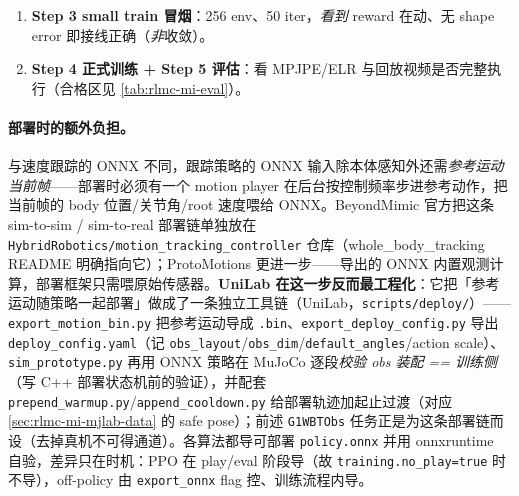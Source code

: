 \begin{practice}
\begin{enumerate}
\begin{codebox}[bash]{训练前静态自检：先 grep 定位 cfg 类，再打印 std/threshold/body\_names（不启动训练）}
    print(f"{name:30s} weight={getattr(term,'weight',None)} std={p.get('std')} "
          f"bodies={p.get('body_names', p.get('body_name'))}")
PY
# 期望看到 motion_body_pos std=0.3 / motion_body_ori std=0.4 / motion_body_ang_vel std=3.14 …
\end{codebox}
（若你本地 cfg 的字段组织与此略有出入，关键不在脚本逐字照跑，而在掌握「配置是可静态 import 的 dataclass，训练前先把 std/阈值/body\_names 打出来核一遍」这一招。）
\item \textbf{Step 3 small train 冒烟}：256 env、50 iter，\emph{看到} reward 在动、无 shape error 即接线正确（\emph{非}收敛）。
\item \textbf{Step 4 正式训练 + Step 5 评估}：看 MPJPE/ELR 与回放视频是否完整执行（合格区见 \cref{tab:rlmc-mi-eval}）。
\end{enumerate}
\end{practice}

\paragraph{部署时的额外负担。}与速度跟踪的 ONNX 不同，跟踪策略的 ONNX 输入除本体感知外还需\emph{参考运动当前帧}——部署时必须有一个 motion player 在后台按控制频率步进参考动作，把当前帧的 body 位置/关节角/root 速度喂给 ONNX。BeyondMimic 官方把这条 sim-to-sim / sim-to-real 部署链单独放在 \verb|HybridRobotics/motion_tracking_controller| 仓库（whole\_body\_tracking README 明确指向它）；ProtoMotions 更进一步——导出的 ONNX 内置观测计算，部署框架只需喂原始传感器。\textbf{UniLab 在这一步反而最工程化}：它把「参考运动随策略一起部署」做成了一条独立工具链（UniLab，\verb|scripts/deploy/|）——\verb|export_motion_bin.py| 把参考运动导成 \verb|.bin|、\verb|export_deploy_config.py| 导出 \verb|deploy_config.yaml|（记 \verb|obs_layout|/\verb|obs_dim|/\verb|default_angles|/action scale）、\verb|sim_prototype.py| 再用 ONNX 策略在 MuJoCo 逐段\emph{校验 obs 装配 == 训练侧}（写 C++ 部署状态机前的验证），并配套 \verb|prepend_warmup.py|/\verb|append_cooldown.py| 给部署轨迹加起止过渡（对应 \cref{sec:rlmc-mi-mjlab-data} 的 safe pose）；前述 \verb|G1WBTObs| 任务正是为这条部署链而设（去掉真机不可得通道）。各算法都导可部署 \verb|policy.onnx| 并用 onnxruntime 自验，差异只在时机：PPO 在 play/eval 阶段导（故 \verb|training.no_play=true| 时不导），off-policy 由 \verb|export_onnx| flag 控、训练流程内导。

